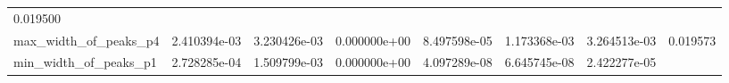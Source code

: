 \documentclass[11pt]{article}
\begin{document}
\begin{longtable}[]{@{}llllllll@{}}
\begin{minipage}[t]{0.08\columnwidth}
0.019500\strut
\end{minipage}\tabularnewline
\begin{minipage}[t]{0.16\columnwidth}\raggedright
max\_width\_of\_peaks\_p4\strut
\end{minipage} & \begin{minipage}[t]{0.09\columnwidth}\raggedright
2.410394e-03\strut
\end{minipage} & \begin{minipage}[t]{0.09\columnwidth}\raggedright
3.230426e-03\strut
\end{minipage} & \begin{minipage}[t]{0.09\columnwidth}\raggedright
0.000000e+00\strut
\end{minipage} & \begin{minipage}[t]{0.09\columnwidth}\raggedright
8.497598e-05\strut
\end{minipage} & \begin{minipage}[t]{0.09\columnwidth}\raggedright
1.173368e-03\strut
\end{minipage} & \begin{minipage}[t]{0.09\columnwidth}\raggedright
3.264513e-03\strut
\end{minipage} & \begin{minipage}[t]{0.08\columnwidth}\raggedright
0.019573\strut
\end{minipage}\tabularnewline
\begin{minipage}[t]{0.16\columnwidth}\raggedright
min\_width\_of\_peaks\_p1\strut
\end{minipage} & \begin{minipage}[t]{0.09\columnwidth}\raggedright
2.728285e-04\strut
\end{minipage} & \begin{minipage}[t]{0.09\columnwidth}\raggedright
1.509799e-03\strut
\end{minipage} & \begin{minipage}[t]{0.09\columnwidth}\raggedright
0.000000e+00\strut
\end{minipage} & \begin{minipage}[t]{0.09\columnwidth}\raggedright
4.097289e-08\strut
\end{minipage} & \begin{minipage}[t]{0.09\columnwidth}\raggedright
6.645745e-08\strut
\end{minipage} & \begin{minipage}[t]{0.09\columnwidth}\raggedright
2.422277e-05\strut
\end{minipage} & \begin{minipage}[t]{0.08\columnwidth}\raggedright

\end{minipage}
\end{longtable}
\end{document}

